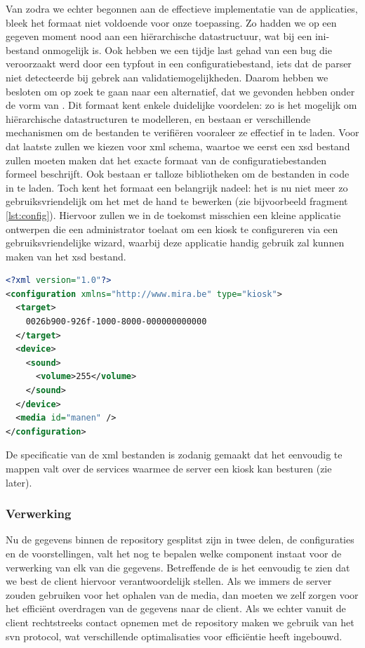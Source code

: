 Van zodra we echter begonnen aan de effectieve implementatie van de applicaties, bleek het formaat niet voldoende voor onze toepassing. Zo hadden we op een gegeven moment nood aan een hiërarchische datastructuur, wat bij een ini-bestand onmogelijk is. Ook hebben we een tijdje last gehad van een bug die veroorzaakt werd door een typfout in een configuratiebestand, iets dat de parser niet detecteerde bij gebrek aan validatiemogelijkheden. Daarom hebben we besloten om op zoek te gaan naar een alternatief, dat we gevonden hebben onder de vorm van . Dit formaat kent enkele duidelijke voordelen: zo is het mogelijk om hiërarchische datastructuren te modelleren, en bestaan er verschillende mechanismen om de bestanden te verifiëren vooraleer ze effectief in te laden. Voor dat laatste zullen we kiezen voor \ac{xml} schema, waartoe we eerst een \ac{xsd} bestand zullen moeten maken dat het exacte formaat van de configuratiebestanden formeel beschrijft. Ook bestaan er talloze bibliotheken om de bestanden in code in te laden. Toch kent het formaat een belangrijk nadeel: het is nu niet meer zo gebruiksvriendelijk om het met de hand te bewerken (zie bijvoorbeeld fragment \ref{lst:config}). Hiervoor zullen we in de toekomst misschien een kleine applicatie ontwerpen die een administrator toelaat om een kiosk te configureren via een gebruiksvriendelijke wizard, waarbij deze applicatie handig gebruik zal kunnen maken van het \ac{xsd} bestand. 

\begin{lstlisting}[language=XML, float, caption=Voorbeeld van een kiosk configuratiebstand., label=lst:config]
<?xml version="1.0"?>
<configuration xmlns="http://www.mira.be" type="kiosk">
  <target>
    0026b900-926f-1000-8000-000000000000
  </target>
  <device>
    <sound>
      <volume>255</volume>
    </sound>
  </device>
  <media id="manen" />
</configuration>
\end{lstlisting}

De specificatie van de \ac{xml} bestanden is zodanig gemaakt dat het eenvoudig te mappen valt over de services waarmee de server een kiosk kan besturen (zie later).

\subsubsection{Verwerking}

Nu de gegevens binnen de repository gesplitst zijn in twee delen, de configuraties en de voorstellingen, valt het nog te bepalen welke component instaat voor de verwerking van elk van die gegevens. Betreffende de  is het eenvoudig te zien dat we best de client hiervoor verantwoordelijk stellen. Als we immers de server zouden gebruiken voor het ophalen van de media, dan moeten we zelf zorgen voor het efficiënt overdragen van de gegevens naar de client. Als we echter vanuit de client rechtstreeks contact opnemen met de repository maken we gebruik van het \ac{svn} protocol, wat verschillende optimalisaties voor efficiëntie heeft ingebouwd.

